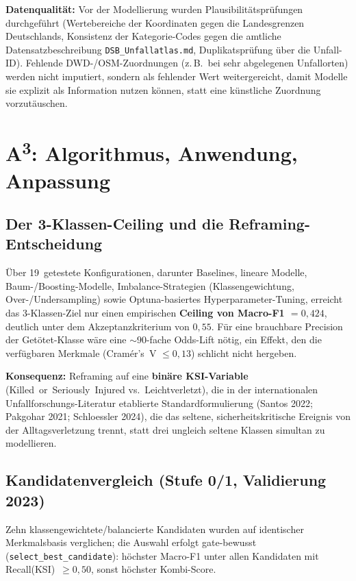 \documentclass[11pt,a4paper]{article}
\newcommand{\code}[1]{\texttt{\small #1}}
\begin{document}
\textbf{Datenqualität:} Vor der Modellierung wurden Plausibilitätsprüfungen
durchgeführt (Wertebereiche der Koordinaten gegen die Landesgrenzen
Deutschlands, Konsistenz der Kategorie-Codes gegen die amtliche
Datensatzbeschreibung \code{DSB\_Unfallatlas.md}, Duplikatsprüfung über
die Unfall-ID). Fehlende DWD-/OSM-Zuordnungen (z.\,B.\ bei sehr
abgelegenen Unfallorten) werden nicht imputiert, sondern als fehlender
Wert weitergereicht, damit Modelle sie explizit als Information nutzen
können, statt eine künstliche Zuordnung vorzutäuschen.


\section{A\textsuperscript{3}: Algorithmus, Anwendung, Anpassung}
\subsection*{Der 3-Klassen-Ceiling und die Reframing-Entscheidung}
Über 19~getestete Konfigurationen, darunter Baselines, lineare Modelle,
Baum-/Boosting-Modelle, Imbalance-Strategien (Klassengewichtung,
Over-/Undersampling) sowie Optuna-basiertes Hyperparameter-Tuning,
erreicht das 3-Klassen-Ziel nur einen empirischen \textbf{Ceiling von
Macro-F1 $= 0{,}424$}, deutlich unter dem Akzeptanzkriterium von
$0{,}55$. Für eine brauchbare Precision der Getötet-Klasse wäre eine
$\sim\!90$-fache Odds-Lift nötig, ein Effekt, den die verfügbaren
Merkmale (Cramér's~V $\leq 0{,}13$) schlicht nicht hergeben.

\textbf{Konsequenz:} Reframing auf eine \textbf{binäre KSI-Variable}
(Killed~or~Seriously~Injured vs.\ Leichtverletzt), die in der
internationalen Unfallforschungs-Literatur etablierte
Standardformulierung (Santos 2022; Pakgohar 2021; Schloessler 2024),
die das seltene, sicherheitskritische Ereignis von der
Alltagsverletzung trennt, statt drei ungleich seltene Klassen simultan
zu modellieren.

\subsection*{Kandidatenvergleich (Stufe 0/1, Validierung 2023)}
Zehn klassengewichtete/balancierte Kandidaten wurden auf identischer
Merkmalsbasis verglichen; die Auswahl erfolgt gate-bewusst
(\code{select\_best\_candidate}): höchster Macro-F1 unter allen
Kandidaten mit Recall(KSI)~$\geq 0{,}50$, sonst höchster Kombi-Score.
\end{document}
